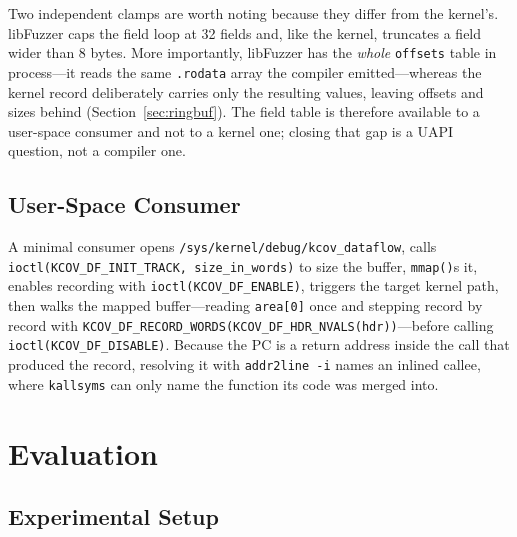 \documentclass{article}
\begin{document}
Two independent clamps are worth noting because they differ from the kernel's.
libFuzzer caps the field loop at 32 fields and, like the kernel, truncates a
field wider than 8 bytes. More importantly, libFuzzer has the \emph{whole}
\texttt{offsets} table in process---it reads the same \texttt{.rodata} array
the compiler emitted---whereas the kernel record deliberately carries only the
resulting values, leaving offsets and sizes behind
(Section~\ref{sec:ringbuf}). The field table is therefore available to a
user-space consumer and not to a kernel one; closing that gap is a UAPI
question, not a compiler one.

\subsection{User-Space Consumer}

A minimal consumer opens \texttt{/sys/kernel/debug/kcov\_dataflow}, calls
\texttt{ioctl(KCOV\_DF\_INIT\_TRACK, size\_in\_words)} to size the buffer,
\texttt{mmap()}s it, enables recording with \texttt{ioctl(KCOV\_DF\_ENABLE)},
triggers the target kernel path, then walks the mapped buffer---reading
\texttt{area[0]} once and stepping record by record with
\texttt{KCOV\_DF\_RECORD\_WORDS(KCOV\_DF\_HDR\_NVALS(hdr))}---before calling
\texttt{ioctl(KCOV\_DF\_DISABLE)}. Because the PC is a return address inside
the call that produced the record, resolving it with
\texttt{addr2line -i} names an inlined callee, where \texttt{kallsyms} can only
name the function its code was merged into.


\section{Evaluation}\label{sec:eval}

\subsection{Experimental Setup}
\end{document}
